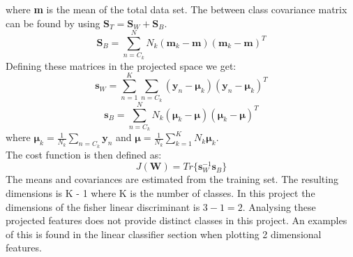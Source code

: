 where \textbf{m} is the mean of the total data set. The between class covariance matrix can be found by using $\textbf{S}_T = \textbf{S}_W + \textbf{S}_B$.
\begin{equation}
\textbf{S}_B = \sum^N_{n=C_k} N_k(\textbf{m}_k - \textbf{m})(\textbf{m}_k - \textbf{m})^T 
\end{equation}
Defining these matrices in the projected space we get:
\begin{equation}
\textbf{s}_W = \sum^K_{n=1} 
\sum_{n=C_k} (\textbf{y}_n - 
\boldsymbol{\mu}_k)
(\textbf{y}_n - 
\boldsymbol{\mu}_k)^T 
\end{equation}
\begin{equation}
\textbf{s}_B = \sum^N_{n=C_k} N_k(\boldsymbol{\mu}_k - \boldsymbol{\mu})(\boldsymbol{\mu}_k - \boldsymbol{\mu})^T 
\end{equation}
where $\boldsymbol{\mu}_k = \frac{1}{N_k}\sum_{n=C_k}\textbf{y}_n$ 
and $\boldsymbol{\mu} = \frac{1}{N_k}\sum^K_{k=1}N_k \boldsymbol{\mu}_k$.\\
The cost function is then defined as:
\begin{equation}
J(\textbf{W}) =  Tr\{\textbf{s}^{-1}_W\textbf{s}_B\}
\end{equation}
The means and covariances are estimated from the training set. The resulting dimensions is K - 1  where K is the number of classes. In this project the dimensions of the fisher linear discriminant is $3 - 1 = 2$. Analysing these projected features does not provide distinct classes in this project. An examples of this is found in the linear classifier section when plotting 2 dimensional features.

